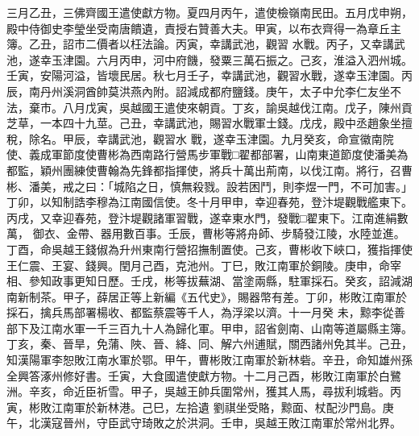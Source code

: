 \begin{pinyinscope}
 三月乙丑，三佛齊國王遣使獻方物。夏四月丙午，遣使檢嶺南民田。五月戊申朔，殿中侍御史李瑩坐受南唐饋遺，責授右贊善大夫。甲寅，以布衣齊得一為章丘主簿。乙丑，詔市二價者以枉法論。丙寅，幸講武池，觀習
 水戰。丙子，又幸講武池，遂幸玉津園。六月丙申，河中府饑，發粟三萬石振之。己亥，淮溢入泗州城。壬寅，安陽河溢，皆壞民居。秋七月壬子，幸講武池，觀習水戰，遂幸玉津園。丙辰，南丹州溪洞酋帥莫洪燕內附。詔減成都府鹽錢。庚午，太子中允李仁友坐不法，棄市。八月戊寅，吳越國王遣使來朝貢。丁亥，諭吳越伐江南。戊子，陳州貢芝草，一本四十九莖。己丑，幸講武池，賜習水戰軍士錢。戊戌，殿中丞趙象坐擅稅，除名。甲辰，幸講武池，觀習水
 戰，遂幸玉津園。九月癸亥，命宣徽南院使、義成軍節度使曹彬為西南路行營馬步軍戰□翟都部署，山南東道節度使潘美為都監，穎州團練使曹翰為先鋒都指揮使，將兵十萬出荊南，以伐江南。將行，召曹彬、潘美，戒之曰：「城陷之日，慎無殺戮。設若困鬥，則李煜一門，不可加害。」丁卯，以知制誥李穆為江南國信使。冬十月甲申，幸迎春苑，登汴堤觀戰艦東下。丙戌，又幸迎春苑，登汴堤觀諸軍習戰，遂幸東水門，發戰□翟東下。江南進絹數萬，
 御衣、金帶、器用數百事。壬辰，曹彬等將舟師、步騎發江陵，水陸並進。丁酉，命吳越王錢俶為升州東南行營招撫制置使。己亥，曹彬收下峽口，獲指揮使王仁震、王宴、錢興。閏月己酉，克池州。丁巳，敗江南軍於銅陵。庚申，命宰相、參知政事更知日歷。壬戌，彬等拔蕪湖、當塗兩縣，駐軍採石。癸亥，詔減湖南新制茶。甲子，薛居正等上新編《五代史》，賜器幣有差。丁卯，彬敗江南軍於採石，擒兵馬部署楊收、都監蔡震等千人，為浮梁以濟。十一月癸
 未，黥李從善部下及江南水軍一千三百九十人為歸化軍。甲申，詔省劍南、山南等道屬縣主簿。丁亥，秦、晉旱，免蒲、陜、晉、絳、同、解六州逋賦，關西諸州免其半。己丑，知漢陽軍李恕敗江南水軍於鄂。甲午，曹彬敗江南軍於新林砦。辛丑，命知雄州孫全興答涿州修好書。壬寅，大食國遣使獻方物。十二月己酉，彬敗江南軍於白鷺洲。辛亥，命近臣祈雪。甲子，吳越王帥兵圍常州，獲其人馬，尋拔利城砦。丙寅，彬敗江南軍於新林港。己巳，左拾遺
 劉祺坐受賂，黥面、杖配沙門島。庚午，北漢寇晉州，守臣武守琦敗之於洪洞。壬申，吳越王敗江南軍於常州北界。




\end{pinyinscope}

